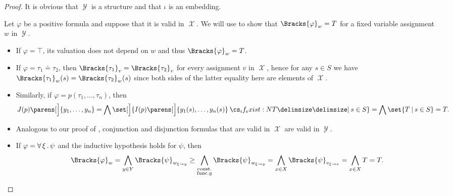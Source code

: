 \begin{proof}
  It is obvious that \( \mscrY \) is a structure and that \( \iota \) is an embedding.

  Let \( \varphi \) be a positive formula and suppose that it is valid in \( \mscrX \). We will use  to show that \( \Bracks{\varphi}_w = T \) for a fixed variable assignment \( w \) in \( \mscrY \).
  \begin{itemize}
    \item If \( \varphi = \top \), its valuation does not depend on \( w \) and thus \( \Bracks{\varphi}_w = T \).

    \item If \( \varphi = \tau_1 \doteq \tau_2 \), then \( \Bracks{\tau_1}_v = \Bracks{\tau_2}_v \) for every assignment \( v \) in \( \mscrX \), hence for any \( s \in S \) we have \( \Bracks{\tau_1}_w(s) = \Bracks{\tau_2}_w(s) \) since both sides of the latter equality here are elements of \( \mscrX \).

    \item Similarly, if \( \varphi = p(\tau_1, \ldots, \tau_n) \), then
    \begin{equation*}
      J(p) \parens[\Big]{ y_1, \ldots, y_n }
      =
      \bigwedge \set[\Big]{ I(p) \parens[\Big]{ y_1(s), \ldots, y_n(s) } \given* s \in S }
      =
      \bigwedge \set{ T \given s \in S }
      =
      T.
    \end{equation*}

    \item Analogous to our proof of , conjunction and disjunction formulas that are valid in \( \mscrX \) are valid in \( \mscrY \).

    \item If \( \varphi = \forall \thinspace \xi \thinspace . \thinspace \psi \) and the inductive hypothesis holds for \( \psi \), then
    \begin{equation*}
      \Bracks{\varphi}_w
      =
      \bigwedge_{y \in Y} \Bracks{\psi}_{w_{\xi \to y}}
      \geq
      \bigwedge_{\substack{\T{const.} \\ \T{func.} y}} \Bracks{\psi}_{w_{\xi \to y}}
      =
      \bigwedge_{x \in X} \Bracks{\psi}_{v_{\xi \to x}}
      =
      \bigwedge_{x \in X} T
      =
      T.
    \end{equation*}
  \end{itemize}
\end{proof}

